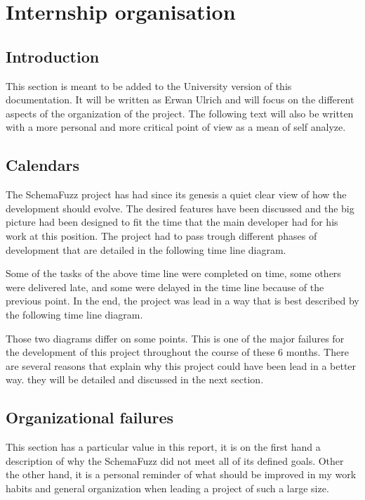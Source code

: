 
\section{Internship organisation} 
	\subsection{Introduction}

This section is meant to be added to the University version of this documentation. It will be written as Erwan Ulrich and will focus on the different aspects of the organization of the project. The following text will also be written with a more personal and more critical point of view as a mean of self analyze.

	\subsection{Calendars}
	
The	SchemaFuzz project has had since its genesis a quiet clear view of how the development should evolve. The desired features have been discussed and the big picture had been designed to fit the time that the main developer had for his work at this position.
The project had to pass trough different phases of development that are detailed in the following time line diagram. %

Some of the tasks of the above time line were completed on time, some others were delivered late, and some were delayed in the time line because of the previous point.
In the end, the project was lead in a way that is best described by the following time line diagram.    %

Those two diagrams differ on some points. This is one of the major failures for the development of this project throughout the course of these 6 months. 
There are several reasons that explain why this project could have been lead in a better way.
they will be detailed and discussed in the next section. 

	\subsection{Organizational failures}
This section has a particular value in this report, it is on the first hand a description of why the SchemaFuzz did not meet all of its defined goals.
Other the other hand, it is a personal reminder of what should be improved in my work habits and general organization when leading a project of such a large size. 
	
